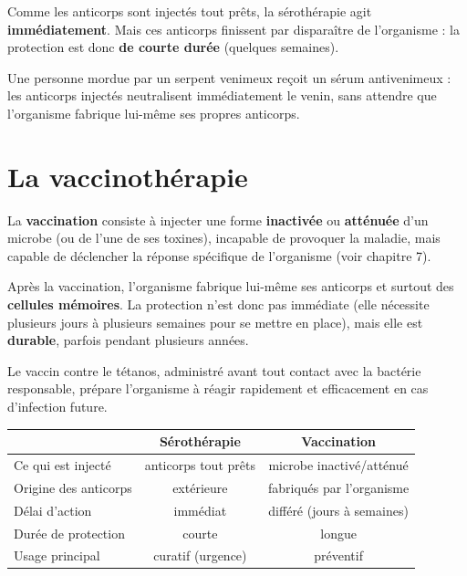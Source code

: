 \begin{propriete}
Comme les anticorps sont injectés tout prêts, la sérothérapie agit
\textbf{immédiatement}. Mais ces anticorps finissent par disparaître de l'organisme :
la protection est donc \textbf{de courte durée} (quelques semaines).
\end{propriete}

\begin{exemple}
Une personne mordue par un serpent venimeux reçoit un sérum antivenimeux : les
anticorps injectés neutralisent immédiatement le venin, sans attendre que l'organisme
fabrique lui-même ses propres anticorps.
\end{exemple}

\section{La vaccinothérapie}

\begin{definition}[Vaccination]
La \textbf{vaccination} consiste à injecter une forme \textbf{inactivée} ou
\textbf{atténuée} d'un microbe (ou de l'une de ses toxines), incapable de provoquer la
maladie, mais capable de déclencher la réponse spécifique de l'organisme (voir
chapitre 7).
\end{definition}

\begin{propriete}
Après la vaccination, l'organisme fabrique lui-même ses anticorps et surtout des
\textbf{cellules mémoires}. La protection n'est donc pas immédiate (elle nécessite
plusieurs jours à plusieurs semaines pour se mettre en place), mais elle est
\textbf{durable}, parfois pendant plusieurs années.
\end{propriete}

\begin{exemple}
Le vaccin contre le tétanos, administré avant tout contact avec la bactérie
responsable, prépare l'organisme à réagir rapidement et efficacement en cas
d'infection future.
\end{exemple}

\begin{propriete}
\begin{center}
\small
\begin{tabular}{lcc}
\toprule
& \textbf{Sérothérapie} & \textbf{Vaccination} \\
\midrule
Ce qui est injecté & anticorps tout prêts & microbe inactivé/atténué \\
Origine des anticorps & extérieure & fabriqués par l'organisme \\
Délai d'action & immédiat & différé (jours à semaines) \\
Durée de protection & courte & longue \\
Usage principal & curatif (urgence) & préventif \\
\bottomrule
\end{tabular}
\end{center}
\end{propriete}

